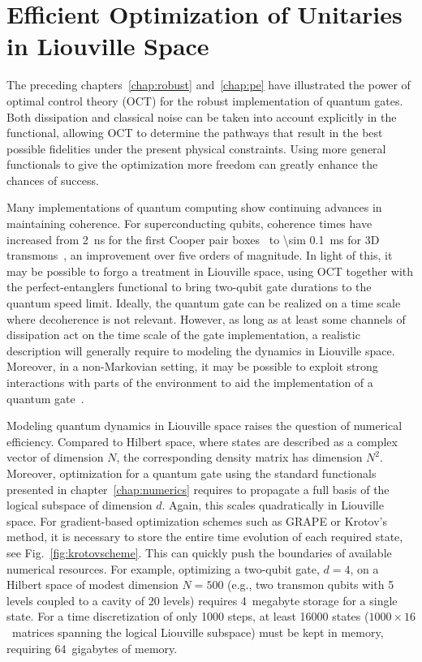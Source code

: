 \chapter{Efficient Optimization of Unitaries in Liouville Space}
\label{chap:3states}


The preceding chapters~\ref{chap:robust} and~\ref{chap:pe} have illustrated
the power of optimal control theory (OCT) for the robust implementation of quantum
gates. Both dissipation and classical noise can be taken into account explicitly
in the functional, allowing OCT to determine the pathways that result in the
best possible fidelities under the present physical constraints. Using more
general functionals to give the optimization more freedom can greatly enhance
the chances of success.

Many implementations of quantum computing show continuing advances in
maintaining coherence. For superconducting qubits, coherence times have
increased from \SI{2}{ns} for the first Cooper pair boxes~\cite{NakamuraN1999}
to \SI{\sim 0.1}{ms} for 3D transmons~\cite{RigettiPRB2012}, an improvement over
five orders of magnitude.  In light of this, it may be possible to forgo
a treatment in Liouville space, using OCT together with the perfect-entanglers
functional to bring two-qubit gate durations to the quantum speed limit.
Ideally, the quantum gate can be realized on a time scale where decoherence is
not relevant. However, as long as at least some channels of dissipation act on
the time scale of the gate implementation, a realistic description
will generally require to modeling the dynamics in Liouville space.  Moreover,
in a non-Markovian setting, it may be possible to exploit strong interactions
with parts of the environment to aid the implementation of a quantum
gate~\cite{ReichArXiv1409.7497}.

Modeling quantum dynamics in Liouville space raises the question of numerical
efficiency. Compared to Hilbert space, where states are described as a complex
vector of dimension $N$, the corresponding density matrix has dimension $N^2$.
Moreover, optimization for a quantum gate using the standard functionals
presented in chapter~\ref{chap:numerics} requires to propagate a full basis of
the logical subspace of dimension $d$. Again, this scales quadratically in
Liouville space. For gradient-based optimization schemes such as GRAPE or Krotov's
method, it is necessary to store the entire time evolution of each required
state, see Fig.~\ref{fig:krotovscheme}. This can quickly push the boundaries of
available numerical resources. For example, optimizing a two-qubit gate, $d=4$,
on a Hilbert space of modest dimension $N=500$ (e.g., two transmon qubits with
5 levels coupled to a cavity of 20 levels) requires \SI{4}{megabyte} storage for
a single state. For a time discretization of only 1000 steps, at least 16000
states ($1000 \times 16$~matrices spanning the logical Liouville subspace) must
be kept in memory, requiring 64~gigabytes of memory.

